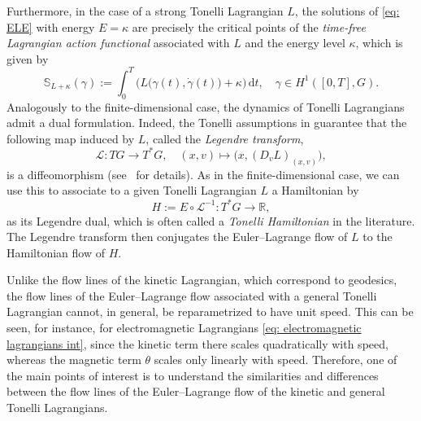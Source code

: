 \documentclass[11pt,reqno]{amsart}
\theoremstyle{plain}
\theoremstyle{definition}
\theoremstyle{plain} %
\theoremstyle{definition} %
\numberwithin{equation}{section}
\begin{document}
Furthermore, in the case of a strong Tonelli Lagrangian $L$, the solutions of \eqref{eq: ELE} with energy \( E = \kappa \) are precisely the critical points of the \emph{time-free Lagrangian action functional} associated with \( L \) and the energy level \( \kappa \), which is given by
\begin{equation}\label{eq: def free action functional}
    \mathbb{S}_{L+\kappa}(\gamma) 
    := \int_0^T \bigg( L \big( \gamma(t), \dot{\gamma}(t) \big) + \kappa \bigg) \, \mathrm{d}t,
    \quad 
    \gamma \in H^1([0,T], G).
\end{equation}
Analogously to the finite-dimensional case, the dynamics of Tonelli Lagrangians admit a dual formulation. Indeed, the Tonelli assumptions in  guarantee that the following map induced by \( L \), called the \emph{Legendre transform},
\begin{equation}\label{eq:defi Legendre transform}
    \mathcal{L} \colon TG \longrightarrow T^*G,
    \quad (x, v) \longmapsto \big(x, (D_v L)_{(x, v)}\big),
\end{equation}
is a diffeomorphism (see~ for details).
As in the finite-dimensional case, we can use this to associate to a given Tonelli Lagrangian \( L \) a Hamiltonian by  
\begin{equation}\label{eq: Tonelli Hamiltonian}
    H := E \circ \mathcal{L}^{-1} \colon T^*G \longrightarrow \mathbb{R},
\end{equation}
as its Legendre dual, which is often called a \textit{Tonelli Hamiltonian} in the literature.
The Legendre transform then conjugates the Euler--Lagrange flow of \( L \) to the Hamiltonian flow of \( H \).

Unlike the flow lines of the kinetic Lagrangian, which correspond to geodesics, the flow lines of the Euler–Lagrange flow associated with a general Tonelli Lagrangian cannot, in general, be reparametrized to have unit speed. 
This can be seen, for instance, for electromagnetic Lagrangians \eqref{eq: electromagnetic lagrangians int}, 
since the kinetic term there scales quadratically with speed, whereas the magnetic term $\theta$ scales only linearly with speed. 
Therefore, one of the main points of interest is to understand the similarities and differences between the flow lines of the Euler–Lagrange flow of the kinetic and general Tonelli Lagrangians.  
\medskip
\end{document}
